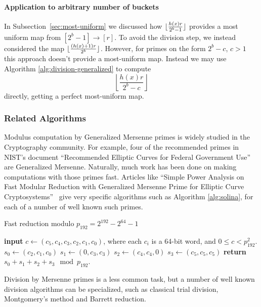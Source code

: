 \paragraph{Application to arbitrary number of buckets}
In Subsection~\ref{sec:most-uniform} we discussed how $\lfloor {\frac{h(x)r}{2^b-1}} \rfloor$ provides a most uniform map from $[2^b-1]\to[r]$.
To avoid the division step, we instead considered the map
$\lfloor {\frac{(h(x)+1)r}{2^b}} \rfloor$.
However, for primes on the form $2^b-c$, $c>1$ this approach doesn't provide a most-uniform map.
%
Instead we may use Algorithm \ref{alg:division-generalized} to compute
$$\left\lfloor\frac{h(x)r}{2^b-c}\right\rfloor$$
directly, getting a perfect most-uniform map.


\subsubsection{Related Algorithms}

Modulus computation by Generalized Mersenne primes is widely studied in the Cryptography community.
For example, four of the recommended primes in NIST's document ``Recommended Elliptic Curves for Federal Government Use'' are Generalized Mersenne.
Naturally, much work has been done on making computations with those primes fast.
Articles like ``Simple Power Analysis on Fast Modular Reduction with Generalized Mersenne Prime for Elliptic Curve Cryptosystems''~\cite{sakai2006simple}
give very specific algorithms such as Algorithm \ref{alg:solina}, for each of a number of well known such primes.

\begin{algorithm}[H]
   \caption{Fast reduction modulo $p_{192} = 2^{192} - 2^{64} - 1$}
   \label{alg:solina}
   \begin{algorithmic}
      \State \textbf{input} $c \gets (c_5, c_4, c_3, c_2, c_1, c_0)$, where each $c_i$ is a 64-bit word, and $0 \le c < p^2_{192}$.
      \State $s_0 \gets (c_2, c_1, c_0)$
      \State $s_1 \gets (0, c_3, c_3)$
      \State $s_2 \gets (c_4, c_4, 0)$
      \State $s_3 \gets (c_5, c_5, c_5)$
      \State \textbf{return} $s_0 + s_1 + s_2 + s_3 \mod p_{192}$.
   \end{algorithmic}
\end{algorithm}

Division by Mersenne primes is a less common task, but a number of well known division algorithms can be specialized, such as 
 classical trial division, Montgomery's method and Barrett reduction.


